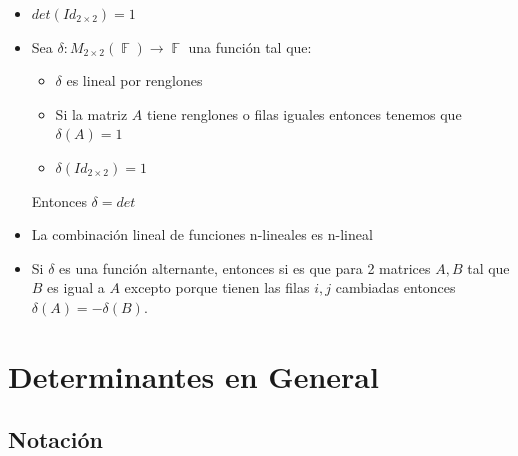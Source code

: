 \documentclass[12pt, fleqn]{report}                             %
\theoremstyle{break}                                            %
\DeclareMathOperator \GenericField {\mathbb{F}}                 %
\begin{document}
\begin{itemize}
                \item
                    $det(Id_{2 \times 2}) = 1$

                \clearpage

                \item
                    Sea $\delta: M_{2 \times 2}(\GenericField) \to \GenericField$ una función
                    tal que:
                    \begin{itemize}
                        \item $\delta$ es lineal por renglones
                        \item Si la matriz $A$ tiene renglones o filas iguales entonces tenemos que
                            $\delta(A) = 1$
                        \item $\delta(Id_{2 \times 2}) = 1$
                    \end{itemize}

                    Entonces $\delta = det$

                \item
                    La combinación lineal de funciones n-lineales es n-lineal

                \item
                    Si $\delta$ es una función alternante, entonces si es que
                    para 2 matrices $A, B$ tal que $B$ es igual a $A$ excepto
                    porque tienen las filas $i, j$ cambiadas entonces
                    $\delta(A) = - \delta(B)$.

            \end{itemize}







    \chapter{Determinantes en General}

        \clearpage
        \section{Notación}
\end{document}

